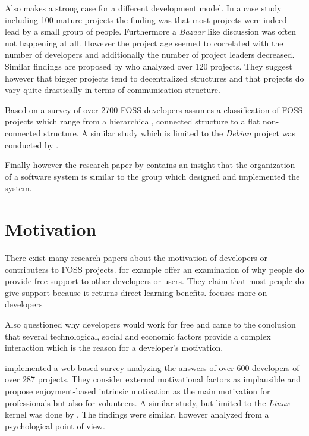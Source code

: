Also \textcite{Krishnamurthy2002} makes a strong case for a different
development model. In a case study including 100 mature projects the finding
was that most projects were indeed lead by a small group of people. Furthermore
a \emph{Bazaar} like discussion was often not happening at all. However the
project age seemed to correlated with the number of developers and additionally
the number of project leaders decreased. Similar findings are proposed by
\textcite{Crowston2005a} who analyzed over 120 projects. They suggest however
that bigger projects tend to decentralized structures and that projects do vary
quite drastically in terms of communication structure.

Based on a survey of over 2700 \ac{FOSS} developers \textcite{Ghosh2005}
assumes a classification of \ac{FOSS} projects which range from a hierarchical,
connected structure to a flat non-connected structure. A similar study which is
limited to the \emph{Debian} project was conducted by \textcite{Sadowski2008}.

Finally however the research paper by \textcite{Conway1968} contains an insight
that the organization of a software system is similar to the group which
designed and implemented the system.


\section{Motivation} %

There exist many research papers about the motivation of developers or
contributers to \ac{FOSS} projects. \textcite{Lakhani2002} for example offer an
examination of why people do provide free support to other developers or users.
They claim that most people do give support because it returns direct learning
benefits. \textcite{Lerner2000} focuses more on developers 

Also \textcite{Grazzini2009} questioned why developers would work for free and
came to the conclusion that several technological, social and economic factors
provide a complex interaction which is the reason for a developer's motivation.

\textcite{Lakhani2003} implemented a web based survey analyzing the answers of
over 600 developers of over 287 projects. They consider external motivational
factors as implausible and propose enjoyment-based intrinsic motivation as the
main motivation for professionals but also for volunteers. A similar study, but
limited to the \emph{Linux} kernel was done by \textcite{Hertel2003}. The
findings were similar, however analyzed from a psychological point of view.

